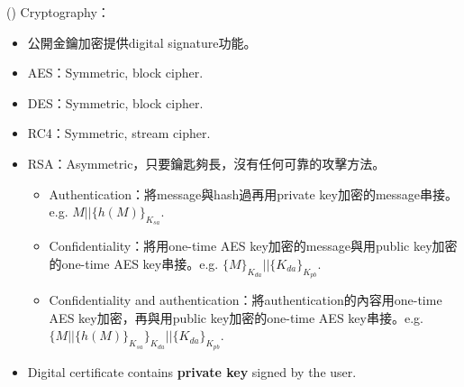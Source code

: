 \begin{theorem}{()} Cryptography： \begin{itemize}
        \item 公開金鑰加密提供digital signature功能。
        \item AES：Symmetric, block cipher.
        \item DES：Symmetric, block cipher.
        \item RC4：Symmetric, stream cipher.
        \item RSA：Asymmetric，只要鑰匙夠長，沒有任何可靠的攻擊方法。\begin{itemize}
            \item Authentication：將message與hash過再用private key加密的message串接。e.g. $M || \{h(M)\}_{K_{sa}}$.
            \item Confidentiality：將用one-time AES key加密的message與用public key加密的one-time AES key串接。e.g. $\{M\}_{K_{da}} || \{K_{da}\}_{K_{pb}}$.
            \item Confidentiality and authentication：將authentication的內容用one-time AES key加密，再與用public key加密的one-time AES key串接。e.g. $\{M || \{h(M)\}_{K_{sa}}\}_{K_{da}} || \{K_{da}\}_{K_{pb}}$.
        \end{itemize}
        \item Digital certificate contains \textbf{private key} signed by the user.
    \end{itemize}
\end{theorem}

